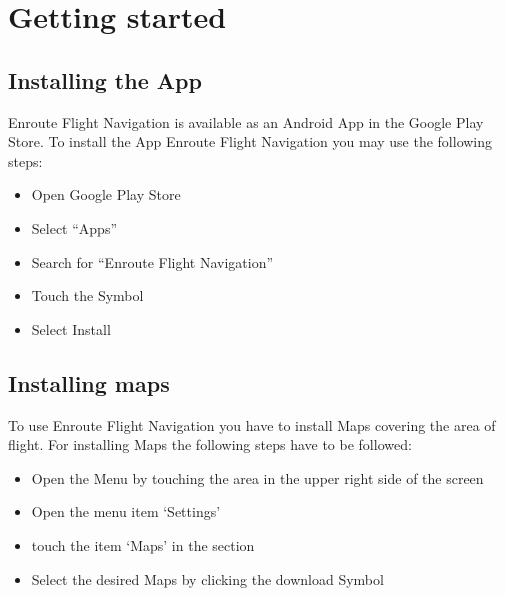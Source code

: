 \documentclass[letterpaper,10pt,english]{sphinxmanual}
\begin{document}
\chapter{Getting started}
\label{\detokenize{01-intro/getting_started:getting-started}}\label{\detokenize{01-intro/getting_started::doc}}

\section{Installing the App}
\label{\detokenize{01-intro/getting_started:installing-the-app}}
Enroute Flight Navigation is available as an Android App in the Google Play Store.
To install the App Enroute Flight Navigation you may use the following steps:
\begin{itemize}
\item {} 
Open Google Play Store

\item {} 
Select “Apps”

\item {} 
Search for “Enroute Flight Navigation”

\item {} 
Touch the Symbol

\item {} 
Select Install

\end{itemize}


\section{Installing maps}
\label{\detokenize{01-intro/getting_started:installing-maps}}
To use Enroute Flight Navigation you have to install Maps covering the area of flight.
For installing Maps the following steps have to be followed:
\begin{itemize}
\item {} 
Open the Menu by touching the area in the upper right side of the screen

\item {} 
Open the menu item ‘Settings’

\item {} 
touch the item ‘Maps’ in the  section

\item {} 
Select the desired Maps by clicking the download Symbol

\end{itemize}
\end{document}
